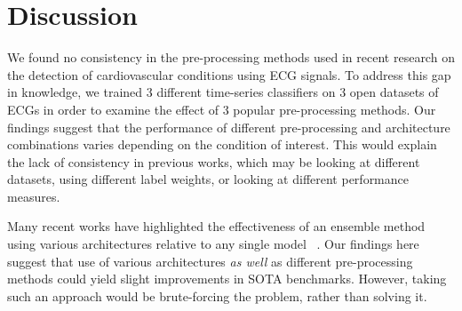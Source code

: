 \documentclass[pmlr,twocolumn]{jmlr}%
\begin{document}
\section{Discussion}
We found no consistency in the pre-processing methods used in recent research on the detection of cardiovascular conditions using ECG signals. To address this gap in knowledge, we trained 3 different time-series classifiers on 3 open datasets of ECGs in order to examine the effect of 3 popular pre-processing methods. Our findings suggest that the performance of different pre-processing and architecture combinations varies depending on the condition of interest. This would explain the lack of consistency in previous works, which may be looking at different datasets, using different label weights, or looking at different performance measures. 

Many recent works have highlighted the effectiveness of an ensemble method using various architectures relative to any single model ~\cite{uwaechia2021comprehensive,hong2022practical,IsmailFawaz2018deep,strodthoff2020deep,chen2020detection}. Our findings here suggest that use of various architectures \textit{as well} as different pre-processing methods could yield slight improvements in SOTA benchmarks. However, taking such an approach would be brute-forcing the problem, rather than solving it. 



\appendix
\end{document}
